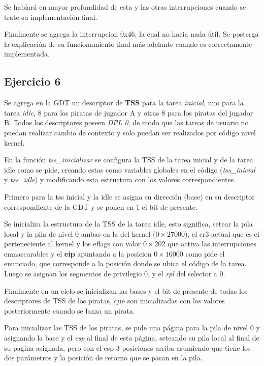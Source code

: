 Se hablará en mayor profundidad de esta y las otras interrupciones cuando se
trate su implementación final.

Finalmente se agrega la interrupcion 0x46, la cual no hacia nada útil. Se
posterga la explicación de su funcionamiento final más adelante cuando es
correctamente implementada.


\subsection{Ejercicio 6}

Se agrega en la GDT un descriptor de {\bf TSS} para la tarea {\it inicial\/},
uno para la tarea {\it idle\/}, 8 para los piratas de jugador A y otras 8 para
los piratas del jugador B. Todos los descriptores poseen {\it DPL 0\/}, de modo
que las tareas de usuario no puedan realizar cambio de contexto y solo puedan
ser realizados por código nivel kernel.

En la función {\it tss_inicializar\/} se configura la TSS de la tarea inicial y
de la tarea idle como se pide, creando estas como variables globales en el
código ({\it tss_inicial} y {\it tss_idle}) y modificando esta estructura con
los valores correspondientes.

Primero para la tss inicial y la idle se asigna su dirección (base) en su
descriptor correspondiente de la GDT y se ponen en 1 el bit de presente.

Se inicializa la estructura de la TSS de la tarea idle, esto significa, setear
la pila local y la pila de nivel 0 ambas en la del kernel ($0\times27000$),
el cr3 actual que es el perteneciente al kernel y los eflags con valor
$0\times202$ que activa las interrupciones enmascarables y el {\bf eip}
apuntando a la posicion $0\times16000$ como pide el enunciado, que corresponde
a la posición donde se ubica el código de la tarea.
Luego se asignan los segmentos de privilegio 0, y el {\it rpl\/} del selector a
0.

Finalmente en un ciclo se inicializan las bases y el bit de presente de todas
los descriptores de TSS de los piratas, que son inicializadas con los valores
posteriormente cuando se lanza un pirata.

Para inicializar las TSS de los piratas, se pide una página para la pila de
nivel 0 y asignando la base y el {\it esp\/} al final de esta página, seteando
su pila local al final de su pagina asignada, pero con el esp 3 posiciones
arriba asumiendo que tiene los dos parámetros y la posición de retorno que se
pasan en la pila.

